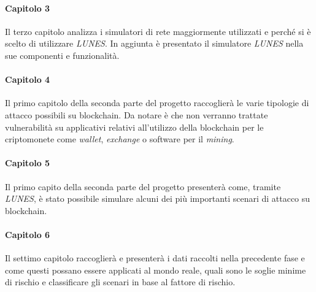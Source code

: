 \paragraph{Capitolo 3}
Il terzo capitolo analizza i simulatori di rete maggiormente utilizzati e perché si è scelto di utilizzare \textit{LUNES}.\newline
In aggiunta è presentato il simulatore \textit{LUNES} nella sue componenti e funzionalità.

\paragraph{Capitolo 4}
Il primo capitolo della seconda parte del progetto raccoglierà le varie tipologie di attacco possibili su blockchain. Da notare è che non verranno trattate vulnerabilità su applicativi relativi all'utilizzo della blockchain per le criptomonete come \textit{wallet}, \textit{exchange} o software per il \textit{mining}.

\paragraph{Capitolo 5}
Il primo capito della seconda parte del progetto presenterà come, tramite \textit{LUNES}, è stato possibile simulare alcuni dei più importanti scenari di attacco su blockchain.

\paragraph{Capitolo 6}
Il settimo capitolo raccoglierà e presenterà i dati raccolti nella precedente fase e come questi possano essere applicati al mondo reale, quali sono le soglie minime di rischio e classificare gli scenari in base al fattore di rischio.

